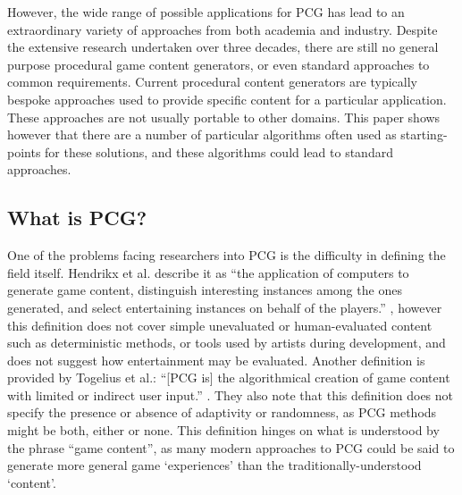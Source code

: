 \documentclass{acm_proc_article-sp}
\begin{document}
However, the wide range of possible applications for PCG has lead to an extraordinary variety of approaches from both academia and industry. Despite the extensive research undertaken over three decades, there are still no general purpose procedural game content generators, or even standard approaches to common requirements. Current procedural content generators are typically bespoke approaches used to provide specific content for a particular application. These approaches are not usually portable to other domains. This paper shows however that there are a number of particular algorithms often used as starting-points for these solutions, and these algorithms could lead to standard approaches.

\subsection{What is PCG?}
One of the problems facing researchers into PCG is the difficulty in defining the field itself.
Hendrikx et al. describe it as ``the application of computers to generate game content, distinguish interesting instances among the ones generated, and select entertaining instances on behalf of the players.'' \cite{hendrikx2012procedural}, however this definition does not cover simple unevaluated or human-evaluated content such as deterministic methods, or tools used by artists during development, and does not suggest how entertainment may be evaluated. Another definition is provided by Togelius et al.: ``[PCG is] the algorithmical creation of game content with limited or indirect user input.'' \cite{togeliusPCGdef}. They also note that this definition does not specify the presence or absence of adaptivity or randomness, as PCG methods might be both, either or none. This definition hinges on what is understood by the phrase ``game content'', as many modern approaches to PCG could be said to generate more general game `experiences' than the traditionally-understood `content'.
\end{document}
